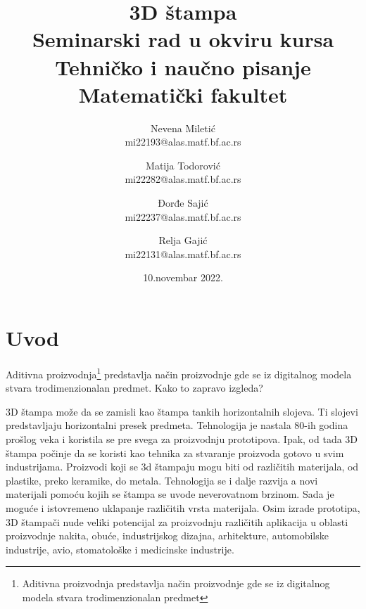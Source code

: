 \documentclass[a4paper]{article}
\begin{document}
\title{3D štampa\\ \small{Seminarski rad u okviru kursa\\Tehničko i naučno pisanje\\ Matematički fakultet}}


\author{    Nevena Miletić\\ mi22193@alas.matf.bf.ac.rs
        \and Matija Todorović\\ mi22282@alas.matf.bf.ac.rs
        \and Đorđe Sajić\\ mi22237@alas.matf.bf.ac.rs
        \and Relja Gajić\\ mi22131@alas.matf.bf.ac.rs
 }

\date{10.novembar 2022.}
\maketitle
{}
\tableofcontents

\newpage

\section{Uvod\cite{b}}
\label{sec:uvod}
Aditivna proizvodnja\footnote{Aditivna proizvodnja predstavlja način proizvodnje gde se iz digitalnog modela stvara trodimenzionalan predmet}  predstavlja način proizvodnje gde se iz digitalnog modela stvara trodimenzionalan predmet. Kako to zapravo izgleda?
\bigbreak

3D štampa može da se zamisli kao štampa tankih horizontalnih slojeva. Ti slojevi predstavljaju horizontalni presek predmeta.
\bigbreak Tehnologija je nastala 80-ih godina prošlog veka i koristila se pre svega za proizvodnju prototipova. Ipak, od tada 3D štampa počinje da se koristi kao tehnika za stvaranje proizvoda gotovo u svim industrijama.
Proizvodi koji se 3d štampaju mogu biti od različitih materijala, od plastike, preko keramike, do metala. Tehnologija se i dalje razvija a novi materijali pomoću kojih se štampa se uvode neverovatnom brzinom. Sada je moguće i istovremeno uklapanje različitih vrsta materijala. Osim izrade prototipa, 3D štampači nude veliki potencijal za proizvodnju različitih aplikacija u oblasti proizvodnje nakita, obuće, industrijskog dizajna, arhitekture, automobilske industrije, avio, stomatološke i medicinske industrije.
\end{document}
